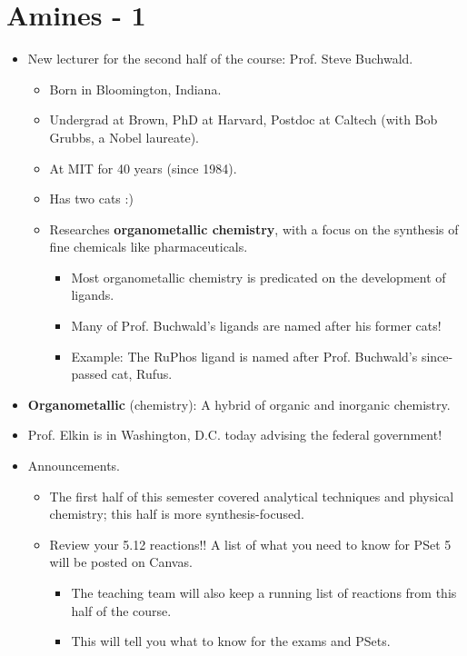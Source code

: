 \documentclass[../notes.tex]{subfiles}
\begin{document}
\section{Amines - 1}
\begin{itemize}
    \item {}New lecturer for the second half of the course: Prof. Steve Buchwald.
    \begin{itemize}
        \item Born in Bloomington, Indiana.
        \item Undergrad at Brown, PhD at Harvard, Postdoc at Caltech (with Bob Grubbs, a Nobel laureate).
        \item At MIT for 40 years (since 1984).
        \item Has two cats :)
        \item Researches \textbf{organometallic chemistry}, with a focus on the synthesis of fine chemicals like pharmaceuticals.
        \begin{itemize}
            \item Most organometallic chemistry is predicated on the development of ligands.
            \item Many of Prof. Buchwald's ligands are named after his former cats!
            \item Example: The RuPhos ligand is named after Prof. Buchwald's since-passed cat, Rufus.
        \end{itemize}
    \end{itemize}
    \item \textbf{Organometallic} (chemistry): A hybrid of organic and inorganic chemistry.
    \item Prof. Elkin is in Washington, D.C. today advising the federal government!
    \pagebreak
    \item Announcements.
    \begin{itemize}
        \item The first half of this semester covered analytical techniques and physical chemistry; this half is more synthesis-focused.
        \item Review your 5.12 reactions!! A list of what you need to know for PSet 5 will be posted on Canvas.
        \begin{itemize}
            \item The teaching team will also keep a running list of reactions from this half of the course.
            \item This will tell you what to know for the exams and PSets.

\end{itemize}
\end{itemize}
\end{itemize}
\end{document}
